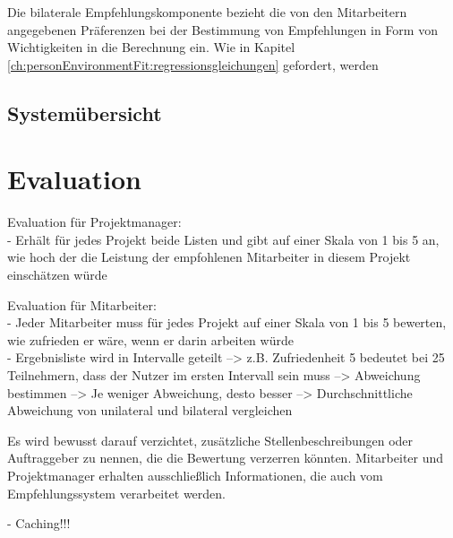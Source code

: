 Die bilaterale Empfehlungskomponente bezieht die von den Mitarbeitern angegebenen Präferenzen bei der Bestimmung von Empfehlungen in Form von Wichtigkeiten in die Berechnung ein. Wie in Kapitel \ref{ch:personEnvironmentFit:regressionsgleichungen} gefordert, werden 

\newpage
\subsection{Systemübersicht}
\label{ch:methodik:versuchsaufbau:systemuebersicht}

\section{Evaluation}
\label{ch:methodik:evaluation}
Evaluation für Projektmanager:\\
- Erhält für jedes Projekt beide Listen und gibt auf einer Skala von 1 bis 5 an, wie hoch der die Leistung der empfohlenen Mitarbeiter in diesem Projekt einschätzen würde

Evaluation für Mitarbeiter:\\
- Jeder Mitarbeiter muss für jedes Projekt auf einer Skala von 1 bis 5 bewerten, wie zufrieden er wäre, wenn er darin arbeiten würde\\
- Ergebnisliste wird in Intervalle geteilt --> z.B. Zufriedenheit 5 bedeutet bei 25 Teilnehmern, dass der Nutzer im ersten Intervall sein muss --> Abweichung bestimmen --> Je weniger Abweichung, desto besser --> Durchschnittliche Abweichung von unilateral und bilateral vergleichen

Es wird bewusst darauf verzichtet, zusätzliche Stellenbeschreibungen oder Auftraggeber zu nennen, die die Bewertung verzerren könnten. Mitarbeiter und Projektmanager erhalten ausschließlich Informationen, die auch vom Empfehlungssystem verarbeitet werden.

- Caching!!!
